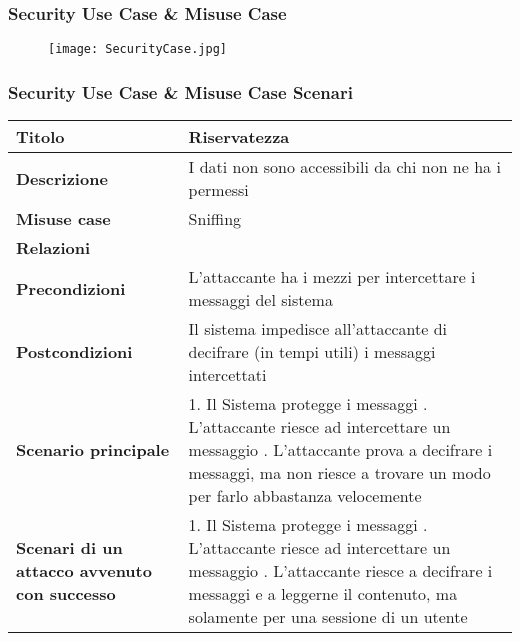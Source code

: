 \newpage
\subsubsection{Security Use Case \& Misuse Case}
\par

\begin{figure}[h!]
  \begin{center}
      \texttt{[image: SecurityCase.jpg]}
  \end{center}
\end{figure}
\newpage


\subsubsection{Security Use Case \& Misuse Case Scenari}
\hfill

\begin{tabular} {|P{4cm}|P{13cm}|}
\hline
  \textbf{Titolo} & Riservatezza\\
\hline
  \textbf{Descrizione} & I dati non sono accessibili da chi non ne ha i permessi\\
\hline
  \textbf{Misuse case} & Sniffing\\
\hline
  \textbf{Relazioni} &\\
\hline
  \textbf{Precondizioni} & L'attaccante ha i mezzi per intercettare i messaggi del sistema\\
\hline
  \textbf{Postcondizioni} & Il sistema impedisce all'attaccante di decifrare (in tempi utili) i messaggi intercettati\\
\hline
  \textbf{Scenario principale} & 1. Il Sistema protegge i messaggi . L'attaccante riesce ad intercettare un messaggio . L'attaccante prova a decifrare i messaggi, ma non riesce a trovare un modo per farlo abbastanza velocemente\\
\hline
  \textbf{Scenari di un attacco avvenuto con successo} & 1. Il Sistema protegge i messaggi . L'attaccante riesce ad intercettare un messaggio . L'attaccante riesce a decifrare i messaggi e a leggerne il contenuto, ma solamente per una sessione di un utente\\
\hline
\end{tabular}

\hfill
\break

